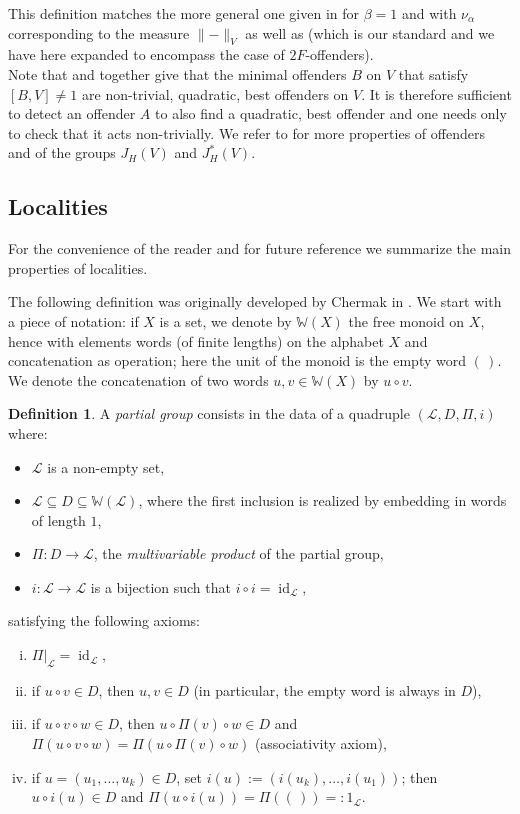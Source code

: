 \documentclass{amsart}
\numberwithin{equation}{section}
\theoremstyle{definition}
\newtheorem{definition}[equation]{Definition}
\theoremstyle{subresult}
\theoremstyle{caseresult}
\newcommand{\W}{\mathbb{W}}
\renewcommand{\L}{\mathcal{L}}
\newcommand{\id}{\operatorname{id}}
\newcommand{\fto}{\longrightarrow}
\newcommand{\<}{\langle}
\renewcommand{\>}{\rangle}
\begin{document}
This definition matches the more general one given in \cite[Section 1]{MPS:2018} for $\beta=1$ and with $\nu_\alpha$ corresponding to the measure $\lVert - \rVert_V$ as well as \cite[Definition A.7]{Meier-Stell-Stroth:2012} (which is our standard and we have here expanded to encompass the case of $2F$-offenders).\\
Note that \cite[Lemma 1.3]{MS:2012a} and \cite[9.2.4]{Kurzweil/Stellmacher:2004} together give that the minimal offenders $B$ on $V$ that satisfy $[B,V]\ne 1$ are non-trivial, quadratic, best offenders on $V$. It is therefore sufficient to detect an offender $A$ to also find a quadratic, best offender and one needs only to check that it acts non-trivially. We refer to \cite[Sections 1 and 2]{MS:2012a} for more properties of offenders and of the groups $J_H(V)$ and $J^*_H(V)$. 

\subsection{Localities}
For the convenience of the reader and for future reference we summarize the main properties of localities.

The following definition was originally developed by Chermak in \cite{Chermak:2013}. We start with a piece of notation: if $X$ is a set, we denote by $\W(X)$ the free monoid on $X$, hence with elements words (of finite lengths) on the alphabet $X$ and concatenation as operation; here the unit of the monoid is the empty word $(\,)$. We denote the concatenation of two words $u,v \in \W(X)$ by $u \circ v$.

\begin{definition}
	\label{def:partial group}
    A \emph{partial group} consists in the data of a quadruple $(\L,D,\Pi,i)$ where:
    \begin{itemize}
        \item $\L$ is a non-empty set,
        \item $\L \subseteq D \subseteq \W(\L)$, where the first inclusion is realized by embedding in words of length $1$,
        \item $\Pi: D \fto \L$, the \emph{multivariable product} of the partial group,
        \item $i: \L \fto \L$ is a bijection such that $i \circ i = \id_\L$,
    \end{itemize}
    satisfying the following axioms:
    \begin{enumerate}[(i)]
        \item $\Pi |_\L = \id_\L$,
        \item if $u \circ v \in D$, then $u,v \in D$ (in particular, the empty word is always in $D$),
        \item if $u \circ v \circ w \in D$, then $u \circ \Pi(v) \circ w \in D$ and $\Pi(u \circ v \circ w) = \Pi(u \circ \Pi(v) \circ w)$ (associativity axiom),
        \item if $u=(u_1, \dots, u_k) \in D$, set $i(u):= (i(u_k), \dots, i(u_1))$; then $u \circ i(u) \in D$ and $\Pi(u \circ i(u)) = \Pi((\,)) =: 1_\L$.
    \end{enumerate}
\end{definition}
\end{document}
